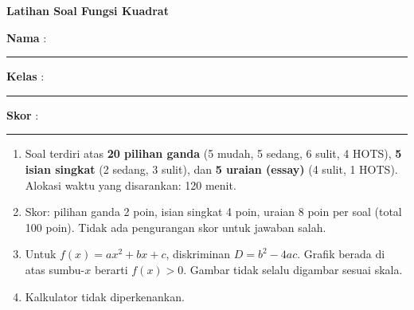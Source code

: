 \documentclass[a4paper,11pt]{article}
\newcounter{no}
\begin{document}
\thispagestyle{fancy}

\begin{center}
  {\color{navy}\fontsize{22}{26}\selectfont\bfseries Latihan Soal Fungsi Kuadrat\par}
\end{center}
\vspace{2pt}
\begin{tcolorbox}[colback=softbg,colframe=navy!40,boxrule=0.6pt,arc=3pt,left=8pt,right=8pt,top=5pt,bottom=5pt]
\noindent\textbf{Nama} : \rule{4.6cm}{0.4pt}\hfill\textbf{Kelas} : \rule{2.2cm}{0.4pt}\hfill\textbf{Skor} : \rule{2.2cm}{0.4pt}
\end{tcolorbox}
\vspace{2pt}
\begin{tcolorbox}[colback=white,colframe=teal,boxrule=0.8pt,arc=3pt,left=8pt,right=8pt,top=4pt,bottom=4pt,title={\bfseries Petunjuk Pengerjaan},coltitle=white,fonttitle=\small]
\small
\begin{enumerate}[leftmargin=1.4em,itemsep=1pt,topsep=1pt]
\item Soal terdiri atas \textbf{20 pilihan ganda} (5 mudah, 5 sedang, 6 sulit, 4 HOTS), \textbf{5 isian singkat} (2 sedang, 3 sulit), dan \textbf{5 uraian (essay)} (4 sulit, 1 HOTS). Alokasi waktu yang disarankan: 120 menit.
\item Skor: pilihan ganda 2 poin, isian singkat 4 poin, uraian 8 poin per soal (total 100 poin). Tidak ada pengurangan skor untuk jawaban salah.
\item Untuk $f(x)=ax^{2}+bx+c$, diskriminan $D=b^{2}-4ac$. Grafik berada di atas sumbu-$x$ berarti $f(x)>0$. Gambar tidak selalu digambar sesuai skala.
\item Kalkulator tidak diperkenankan.
\end{enumerate}
\end{tcolorbox}
\end{document}
